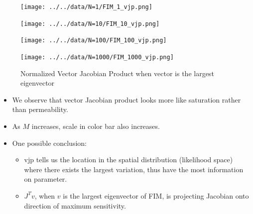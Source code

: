 \documentclass[
]{article}
\providecommand{\tightlist}{%
  \setlength{\itemsep}{0pt}\setlength{\parskip}{0pt}}\usepackage{longtable,booktabs,array}
\begin{document}
\begin{figure}

\begin{minipage}{0.50\linewidth}

\texttt{[image: ../../data/N=1/FIM\_1\_vjp.png]}

\end{minipage}%
%
\begin{minipage}{0.50\linewidth}

\texttt{[image: ../../data/N=10/FIM\_10\_vjp.png]}

\end{minipage}%
\newline
\begin{minipage}{0.50\linewidth}

\texttt{[image: ../../data/N=100/FIM\_100\_vjp.png]}

\end{minipage}%
%
\begin{minipage}{0.50\linewidth}

\texttt{[image: ../../data/N=1000/FIM\_1000\_vjp.png]}

\end{minipage}%

\caption{\label{fig-eig1000}Normalized Vector Jacobian Product when
vector is the largest eigenvector}

\end{figure}%

\begin{itemize}
\tightlist
\item
  We observe that vector Jacobian product looks more like saturation
  rather than permeability.
\item
  As \(M\) increases, scale in color bar also increases.
\item
  One possible conclusion:

  \begin{itemize}
  \tightlist
  \item
    vjp tells us the location in the spatial distribution (likelihood
    space) where there exists the largest variation, thus have the most
    information on parameter.
  \item
    \(J^Tv\), when \(v\) is the largest eigenvector of FIM, is
    projecting Jacobian onto direction of maximum sensitivity.
  \end{itemize}
\end{itemize}
\end{document}
